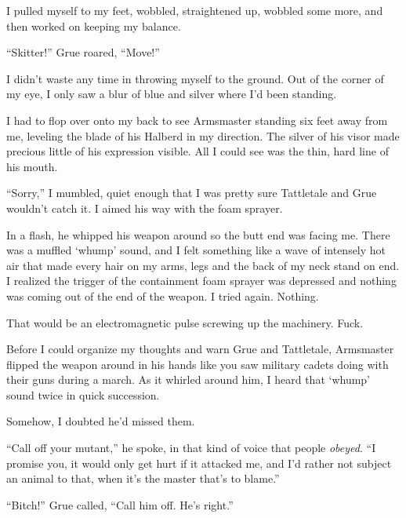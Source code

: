 I pulled myself to my feet, wobbled, straightened up, wobbled some more, and then worked on keeping my balance.



``Skitter!'' Grue roared, ``Move!''



I didn't waste any time in throwing myself to the ground.  Out of the corner of my eye, I only saw a blur of blue and silver where I'd been standing.



I had to flop over onto my back to see Armsmaster standing six feet away from me, leveling the blade of his Halberd in my direction.  The silver of his visor made precious little of his expression visible.  All I could see was the thin, hard line of his mouth.



``Sorry,'' I mumbled, quiet enough that I was pretty sure Tattletale and Grue wouldn't catch it.  I aimed his way with the foam sprayer.



In a flash, he whipped his weapon around so the butt end was facing me.  There was a muffled `whump' sound, and I felt something like a wave of intensely hot air that made every hair on my arms, legs and the back of my neck stand on end.  I realized the trigger of the containment foam sprayer was depressed and nothing was coming out of the end of the weapon.  I tried again.  Nothing.



That would be an electromagnetic pulse screwing up the machinery.  Fuck.



Before I could organize my thoughts and warn Grue and Tattletale, Armsmaster flipped the weapon around in his hands like you saw military cadets doing with their guns during a march.  As it whirled around him, I heard that `whump' sound twice in quick succession.



Somehow, I doubted he'd missed them.



``Call off your mutant,'' he spoke, in that kind of voice that people \emph{obeyed}.  ``I promise you, it would only get hurt if it attacked me, and I'd rather not subject an animal to that, when it's the master that's to blame.''



``Bitch!'' Grue called, ``Call him off.  He's right.''



